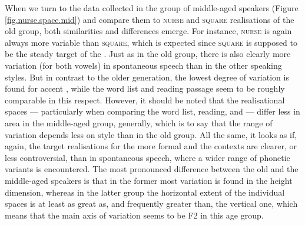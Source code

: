 When we turn to the data collected in the group of middle-aged speakers (Figure \ref{fig.nurse.space.mid}) and compare them to \textsc{nurse} and \textsc{square} realisations of the old group, both similarities and differences emerge.
For instance, \textsc{nurse} is again always more variable than \textsc{square}, which is expected since \textsc{square} is supposed to be the steady target of the .
Just as in the old group, there is also clearly more variation (for both vowels) in spontaneous speech than in the other speaking styles.
But in contrast to the older generation, the lowest degree of variation is found for accent , while the word list and reading passage seem to be roughly comparable in this respect.
However, it should be noted that the realisational spaces --- particularly when comparing the word list, reading, and  --- differ less in area in the middle-aged group, generally, which is to say that the range of variation depends less on style than in the old group.
All the same, it looks as if, again, the target realisations for the more formal and the  contexts are clearer, or less controversial, than in spontaneous speech, where a wider range of phonetic variants is encountered.
The most pronounced difference between the old and the middle-aged speakers is that in the former most variation is found in the height dimension, whereas in the latter group the horizontal extent of the individual  spaces is at least as great as, and frequently greater than, the vertical one, which means that the main axis of variation seems to be F2 in this age group.

